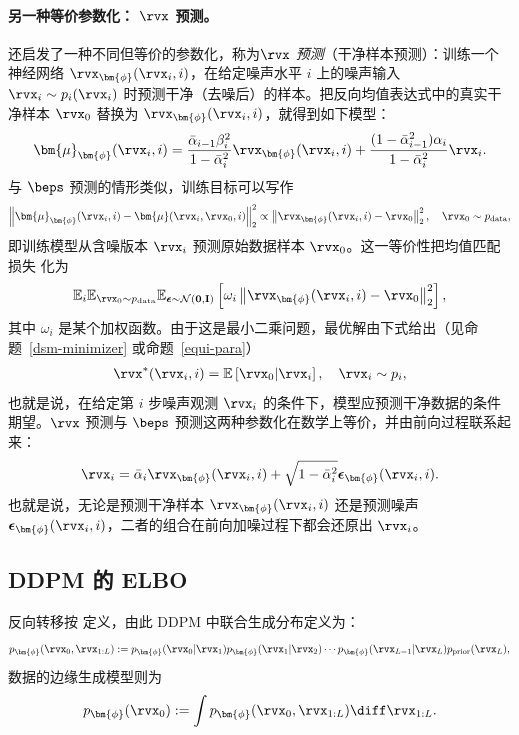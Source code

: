 \paragraph{另一种等价参数化： $\rvx$ 预测。}
 还启发了一种不同但等价的参数化，称为\emph{$\rvx$ 预测}（干净样本预测）：训练一个神经网络 $\rvx_{\bm{\phi}}(\rvx_i, i)$，在给定噪声水平 $i$ 上的噪声输入 $\rvx_i \sim p_i(\rvx_i)$ 时预测干净（去噪后）的样本。把反向均值表达式中的真实干净样本 $\rvx_0$ 替换为 $\rvx_{\bm{\phi}}(\rvx_i, i)$，就得到如下模型：
\begin{align*}
\bm{\mu}_{\bm{\phi}}(\rvx_i, i) = \frac{\bar{\alpha}_{i-1} \beta_i^2}{1 - \bar{\alpha}_i^2} \rvx_{\bm{\phi}}(\rvx_i, i) + \frac{(1 - \bar{\alpha}_{i-1}^2)\alpha_i}{1 - \bar{\alpha}_i^2} \rvx_i.
\end{align*}
与 $\beps$ 预测的情形类似，训练目标可以写作
\[
\left\| \bm{\mu}_{\bm{\phi}}(\rvx_i, i) - \bm{\mu}(\rvx_i, \rvx_0, i) \right\|_2^2 \propto \left\| \rvx_{\bm{\phi}}(\rvx_i, i) - \rvx_0 \right\|_2^2, \quad \rvx_0 \sim p_{\text{data}},
\]
即训练模型从含噪版本 $\rvx_i$ 预测原始数据样本 $\rvx_0$。这一等价性把均值匹配损失  化为
\[
\mathbb{E}_{i} \mathbb{E}_{\rvx_0 \sim p_{\text{data}}} \mathbb{E}_{\boldsymbol{\epsilon} \sim \mathcal{N}(\mathbf{0}, \mathbf{I})} \left[\omega_i \left\| \rvx_{\bm{\phi}}(\rvx_i, i) - \rvx_0 \right\|_2^2 \right],
\]
其中 $\omega_i$ 是某个加权函数。由于这是最小二乘问题，最优解由下式给出（见命题~\ref{dsm-minimizer} 或命题~\ref{equi-para}）
\begin{align}\label{eq:ddpm-clean-minimizer}
    \rvx^*(\rvx_i, i) = \mathbb{E}\left[ \rvx_0|\rvx_i \right], \quad \rvx_i \sim p_i,
\end{align}
也就是说，在给定第 $i$ 步噪声观测 $\rvx_i$ 的条件下，模型应预测干净数据的条件期望。$\rvx$ 预测与 $\beps$ 预测这两种参数化在数学上等价，并由前向过程联系起来：
\begin{equation}\label{eq:ddpm-clean-noise}
    \rvx_i = \bar{\alpha}_i \rvx_{\bm{\phi}}(\rvx_i, i) + \sqrt{1 - \bar{\alpha}_i^2}   \boldsymbol{\epsilon}_{\bm{\phi}}(\rvx_i, i).
\end{equation}
也就是说，无论是预测干净样本 $\rvx_{\bm{\phi}}(\rvx_i, i)$ 还是预测噪声 $\boldsymbol{\epsilon}_{\bm{\phi}}(\rvx_i, i)$，二者的组合在前向加噪过程下都会还原出 $\rvx_i$。


\subsection{DDPM 的 ELBO}\label{subsec:ddpm-elbo}
反向转移按  定义，由此 DDPM 中联合生成分布定义为：
\[
p_{\bm{\phi}}(\rvx_0, \rvx_{1:L}) := p_{\bm{\phi}}(\rvx_0|\rvx_1)  p_{\bm{\phi}}(\rvx_1|\rvx_2)\cdots p_{\bm{\phi}}(\rvx_{L-1}|\rvx_L)   p_{\text{prior}}(\rvx_L),
\]
数据的边缘生成模型则为
\begin{align*}
    p_{\bm{\phi}}(\rvx_0) := \int p_{\bm{\phi}}(\rvx_0, \rvx_{1:L}) \diff \rvx_{1:L}.
\end{align*}

